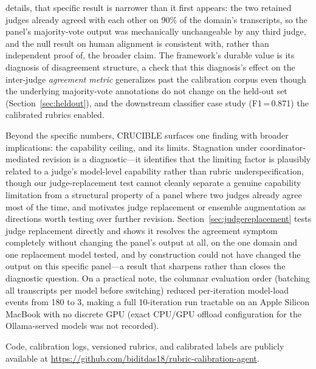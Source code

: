\documentclass[11pt]{article}
\begin{document}
details, that specific result is narrower than it first appears: the two
retained judges already agreed with each other on 90\% of the domain's
transcripts, so the panel's majority-vote output was mechanically
unchangeable by any third judge, and the null result on human alignment is
consistent with, rather than independent proof of, the broader claim. The
framework's durable value is its diagnosis of disagreement structure, a
check that this diagnosis's effect on the inter-judge \emph{agreement
metric} generalizes past the calibration corpus even though the underlying
majority-vote annotations do not change on the held-out set
(Section~\ref{sec:heldout}), and the downstream classifier case study
(F1\,=\,0.871) the calibrated rubrics enabled.

Beyond the specific numbers, CRUCIBLE surfaces one finding with broader
implications: the capability ceiling, and its limits. Stagnation under
coordinator-mediated revision is a diagnostic---it identifies that the
limiting factor is plausibly related to a judge's model-level capability
rather than rubric underspecification, though our judge-replacement test
cannot cleanly separate a genuine capability limitation from a structural
property of a panel where two judges already agree most of the time, and
motivates judge replacement or ensemble augmentation as directions worth
testing over further revision. Section~\ref{sec:judgereplacement} tests
judge replacement directly and shows it resolves the agreement symptom
completely without changing the panel's output at all, on the one domain
and one replacement model tested, and by construction could not have
changed the output on this specific panel---a result that sharpens rather
than closes the diagnostic question. On a practical note, the columnar
evaluation order (batching all transcripts per model before switching)
reduced per-iteration model-load events from 180 to 3, making a full
10-iteration run tractable on an Apple Silicon MacBook with no discrete
GPU (exact CPU/GPU offload configuration for the Ollama-served models was
not recorded).

Code, calibration logs, versioned rubrics, and calibrated labels are publicly
available at \url{https://github.com/biditdas18/rubric-calibration-agent}.
\end{document}
